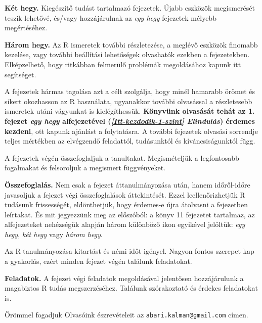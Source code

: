 \documentclass[
]{book}
\makeatletter
\newenvironment{kframe}{%
\medskip{}
\setlength{\fboxsep}{.8em}
 \def\at@end@of@kframe{}%
 \ifinner\ifhmode%
  \def\at@end@of@kframe{\end{minipage}}%
  \begin{minipage}{\columnwidth}%
 \fi\fi%
 \def\FrameCommand##1{\hskip\@totalleftmargin \hskip-\fboxsep
 \colorbox{shadecolor}{##1}\hskip-\fboxsep
     \hskip-\linewidth \hskip-\@totalleftmargin \hskip\columnwidth}%
 \MakeFramed {\advance\hsize-\width
   \@totalleftmargin\z@ \linewidth\hsize
   \@setminipage}}%
 {\par\unskip\endMakeFramed%
 \at@end@of@kframe}
\newenvironment{rmdblock}[1]
  {
  \begin{itemize}
  \renewcommand{\labelitemi}{
    \raisebox{-.7\height}[0pt][0pt]{
      {\setkeys{Gin}{width=3em,keepaspectratio}\texttt{[image: images/\#1]}}
    }
  }
  \setlength{\fboxsep}{1em}
  \begin{kframe}
  \item
  }
  {
  \end{kframe}
  \end{itemize}
  }
\newenvironment{rmdlevel2}
  {\begin{rmdblock}{level2}}
  {\end{rmdblock}}
\newenvironment{rmdlevel3}
  {\begin{rmdblock}{level3}}
  {\end{rmdblock}}
\newenvironment{rmdsummary}
  {\begin{rmdblock}{summary}}
  {\end{rmdblock}}
\newenvironment{rmdexercise}
  {\begin{rmdblock}{exercise}}
  {\end{rmdblock}}
\makeatother
\begin{document}
\begin{rmdlevel2}
\textbf{Két hegy.} Kiegészítő tudást tartalmazó fejezetek. Újabb
eszközök megismerését teszik lehetővé, és/vagy hozzájárulnak az
\emph{egy hegy} fejezetek mélyebb megértéséhez.
\end{rmdlevel2}

\begin{rmdlevel3}
\textbf{Három hegy.} Az R ismeretek további részletezése, a meglévő
eszközök finomabb kezelése, vagy további beállítási lehetőségek
olvashatók ezekben a fejezetekben. Elképzelhető, hogy ritkábban
felmerülő problémák megoldásához kapunk itt segítséget.
\end{rmdlevel3}

A fejezetek hármas tagolása azt a célt szolgálja, hogy minél hamarabb örömet és sikert okozhasson az R használata, ugyanakkor további olvasással a részletesebb ismeretek utáni vágyunkat is kielégíthessük. \textbf{Könyvünk olvasását tehát az 1. fejezet \emph{egy hegy} alfejezetével (\emph{\ref{Itt-kezdodik-1-szint} Elindulás}) érdemes kezdeni}, ott kapunk ajánlást a folytatásra. A további fejezetek olvasási sorrendje teljes mértékben az elvégzendő feladattól, tudásunktól és kíváncsiságunktól függ.

A fejezetek végén összefoglaljuk a tanultakat. Megismételjük a legfontosabb fogalmakat és felsoroljuk a megismert függvényeket.

\begin{rmdsummary}
\textbf{Összefoglalás.} Nem csak a fejezet áttanulmányozása után, hanem
időről-időre javasoljuk a fejezet végi összefoglalások áttekintését.
Ezzel leellenőrizhetjük R tudásunk frissességét, eldönthetjük, hogy
érdemes-e újra átolvasni a fejezetben leírtakat. És mit jegyezzünk meg
az előszóból: a könyv 11 fejezetet tartalmaz, az alfejezeteket
nehézségük alapján három különböző ikon egyikével jelöltük: \emph{egy
hegy}, \emph{két hegy} vagy \emph{három hegy}.
\end{rmdsummary}

Az R tanulmányozása kitartást és némi időt igényel. Nagyon fontos szerepet kap a gyakorlás, ezért minden fejezet végén találunk feladatokat.

\begin{rmdexercise}
\textbf{Feladatok.} A fejezet végi feladatok megoldásával jelentősen
hozzájárulunk a magabiztos R tudás megszerzéséhez. Találunk szórakoztató
és érdekes feladatokat is.
\end{rmdexercise}

Örömmel fogadjuk Olvasóink észrevételeit az \texttt{abari.kalman@gmail.com} címen.
\end{document}
